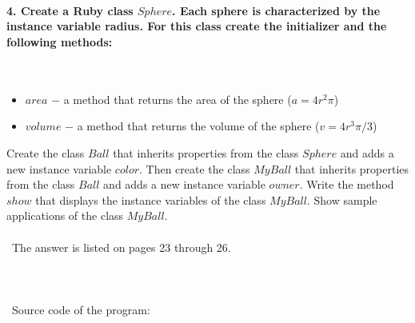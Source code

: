 \documentclass{article}
\begin{document}
\paragraph{}\



\paragraph{4. Create a Ruby class \(Sphere\). Each sphere is characterized by the instance variable radius. For this class create the initializer and the following methods: }\

	\begin{itemize}
		\item \(area\) \(-\) a method that returns the area of the sphere (\(a = 4r^2\pi\))
		\item \(volume\) \(-\) a method that returns the volume of the sphere (\(v = 4r^3\pi / 3\))
	\end{itemize}
	
	Create the class \(Ball\) that inherits properties from the class \(Sphere\) and adds a new instance variable \(color\). Then create the class \(MyBall\) that inherits properties from the class \(Ball\) and adds a new instance variable \(owner\). Write the method \(show\) that displays the instance variables of the class \(MyBall\). Show sample applications of the class \(MyBall\).

\paragraph{}\
	The answer is listed on pages 23 through 26.
	
\paragraph{}\
\paragraph{}\
Source code of the program:
\end{document}
